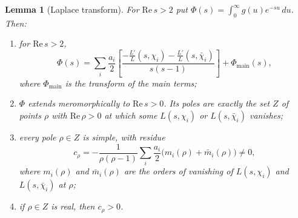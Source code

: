 \documentclass[11pt]{amsart}
\newtheorem{lemma}[theorem]{Lemma}
\theoremstyle{definition}
\theoremstyle{remark}
\begin{document}
\begin{lemma}[Laplace transform]\label{lem:laplace}
For $\mathrm{Re}\,s>2$ put $\Phi(s)=\int_0^\infty g(u)e^{-su}\,du$. Then:
\begin{enumerate}[label=(\alph*)]
\item for $\mathrm{Re}\,s>2$,
\[
\Phi(s)=\sum_i\frac{a_i}{2}\left[\frac{-\frac{L'}{L}(s,\chi_i)-\frac{L'}{L}(s,\bar\chi_i)}{s(s-1)}\right]+\Phi_{\mathrm{main}}(s),
\]
where $\Phi_{\mathrm{main}}$ is the transform of the main terms;
\item $\Phi$ extends meromorphically to $\mathrm{Re}\,s>0$. Its poles are exactly the set $Z$ of points $\rho$ with $\mathrm{Re}\,\rho>0$ at which some $L(s,\chi_i)$ or $L(s,\bar\chi_i)$ vanishes;
\item every pole $\rho\in Z$ is simple, with residue
\[
c_\rho=-\frac{1}{\rho(\rho-1)}\sum_i\frac{a_i}{2}\bigl(m_i(\rho)+\bar m_i(\rho)\bigr)\neq0,
\]
where $m_i(\rho)$ and $\bar m_i(\rho)$ are the orders of vanishing of $L(s,\chi_i)$ and $L(s,\bar\chi_i)$ at $\rho$;
\item if $\rho\in Z$ is real, then $c_\rho>0$.
\end{enumerate}
\end{lemma}
\end{document}
